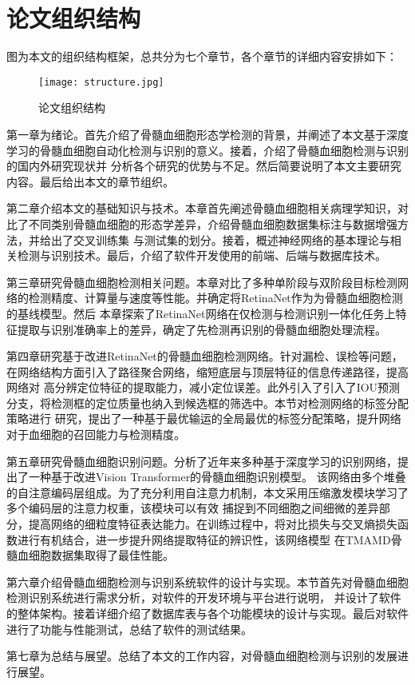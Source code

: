 \section{论文组织结构}
图为本文的组织结构框架，总共分为七个章节，各个章节的详细内容安排如下：

\begin{figure}[htbp]
    \centering
    \texttt{[image: structure.jpg]}
    \caption{论文组织结构}
    \label{fig:structure}
  \end{figure}
  
第一章为绪论。首先介绍了骨髓血细胞形态学检测的背景，并阐述了本文基于深度学习的骨髓血细胞自动化检测与识别的意义。接着，介绍了骨髓血细胞检测与识别的国内外研究现状并
分析各个研究的优势与不足。然后简要说明了本文主要研究内容。最后给出本文的章节组织。

第二章介绍本文的基础知识与技术。本章首先阐述骨髓血细胞相关病理学知识，对比了不同类别骨髓血细胞的形态学差异，介绍骨髓血细胞数据集标注与数据增强方法，并给出了交叉训练集
与测试集的划分。接着，概述神经网络的基本理论与相关检测与识别技术。最后，介绍了软件开发使用的前端、后端与数据库技术。

第三章研究骨髓血细胞检测相关问题。本章对比了多种单阶段与双阶段目标检测网络的检测精度、计算量与速度等性能。并确定将RetinaNet作为为骨髓血细胞检测的基线模型。然后
本章探索了RetinaNet网络在仅检测与检测识别一体化任务上特征提取与识别准确率上的差异，确定了先检测再识别的骨髓血细胞处理流程。

第四章研究基于改进RetinaNet的骨髓血细胞检测网络。针对漏检、误检等问题，在网络结构方面引入了路径聚合网络，缩短底层与顶层特征的信息传递路径，提高网络对
高分辨定位特征的提取能力，减小定位误差。此外引入了引入了IOU预测分支，将检测框的定位质量也纳入到候选框的筛选中。本节对检测网络的标签分配策略进行
研究，提出了一种基于最优输运的全局最优的标签分配策略，提升网络对于血细胞的召回能力与检测精度。

第五章研究骨髓血细胞识别问题。分析了近年来多种基于深度学习的识别网络，提出了一种基于改进Vision Transformer的骨髓血细胞识别模型。
该网络由多个堆叠的自注意编码层组成。为了充分利用自注意力机制，本文采用压缩激发模块学习了多个编码层的注意力权重，该模块可以有效
捕捉到不同细胞之间细微的差异部分，提高网络的细粒度特征表达能力。在训练过程中，将对比损失与交叉熵损失函数进行有机结合，进一步提升网络提取特征的辨识性，该网络模型
在TMAMD骨髓血细胞数据集取得了最佳性能。

第六章介绍骨髓血细胞检测与识别系统软件的设计与实现。本节首先对骨髓血细胞检测识别系统进行需求分析，对软件的开发环境与平台进行说明，
并设计了软件的整体架构。接着详细介绍了数据库表与各个功能模块的设计与实现。最后对软件进行了功能与性能测试，总结了软件的测试结果。

第七章为总结与展望。总结了本文的工作内容，对骨髓血细胞检测与识别的发展进行展望。



